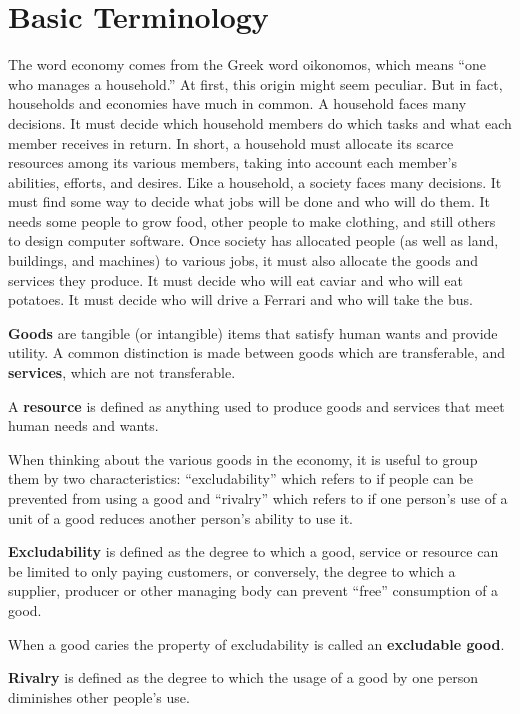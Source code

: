 \section{Basic Terminology}

The word economy comes from the Greek word oikonomos, which means ``one who manages a household.'' At first, this
origin might seem peculiar. But in fact, households and economies have much in common. A household faces many
decisions. It must decide which household members do which tasks and what each member receives in return. In short, a
household must allocate its scarce resources among its various members, taking into account each member's abilities,
efforts, and desires. \v

Like a household, a society faces many decisions. It must find some way to decide what jobs will be done and who will
do them. It needs some people to grow food, other people to make clothing, and still others to design computer
software. Once society has allocated people (as well as land, buildings, and machines) to various jobs, it must also
allocate the goods and services they produce. It must decide who will eat caviar and who will eat potatoes. It must
decide who will drive a Ferrari and who will take the bus.

\textbf{Goods} are tangible (or intangible) items that satisfy human wants and provide utility. A common distinction
is made between goods which are transferable, and \textbf{services}, which are not transferable.
\ed

\bd[Resource]
A \textbf{resource} is defined as anything used to produce goods and services that meet human needs and wants.
\ed

When thinking about the various goods in the economy, it is useful to group them by two characteristics:
``excludability'' which refers to if people can be prevented from using a good and ``rivalry'' which refers to if one
person's use of a unit of a good reduces another person's ability to use it.

\bd[Excludability]
\textbf{Excludability} is defined as the degree to which a good, service or resource can be limited to only paying
customers, or conversely, the degree to which a supplier, producer or other managing body can prevent ``free''
consumption of a good.
\ed

When a good caries the property of excludability is called an \textbf{excludable good}.
\ed

\bd[Rivalry]
\textbf{Rivalry} is defined as the degree to which the usage of a good by one person diminishes other people's use.
\ed

